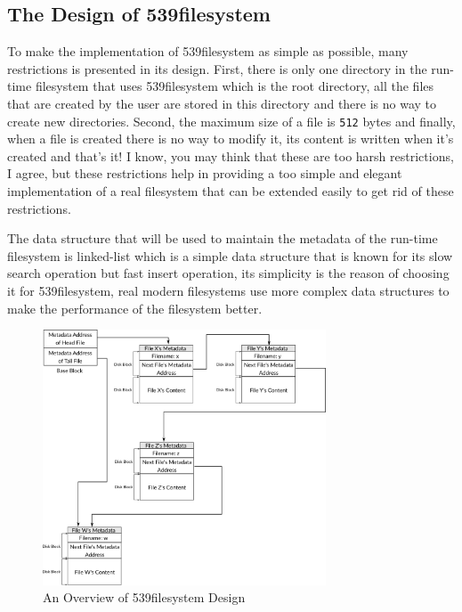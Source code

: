 \subsection{The Design of
539filesystem}\label{the-design-of-539filesystem}

To make the implementation of 539filesystem as simple as possible, many
restrictions is presented in its design. First, there is only one
directory in the run-time filesystem that uses 539filesystem which is
the root directory, all the files that are created by the user are
stored in this directory and there is no way to create new directories.
Second, the maximum size of a file is \lstinline!512! bytes and finally,
when a file is created there is no way to modify it, its content is
written when it's created and that's it! I know, you may think that
these are too harsh restrictions, I agree, but these restrictions help
in providing a too simple and elegant implementation of a real
filesystem that can be extended easily to get rid of these restrictions.

The data structure that will be used to maintain the metadata of the
run-time filesystem is linked-list which is a simple data structure that
is known for its slow search operation but fast insert operation, its
simplicity is the reason of choosing it for 539filesystem, real modern
filesystems use more complex data structures to make the performance of
the filesystem better.

\begin{figure}
\centering
\includegraphics[width=0.75000\textwidth]{Figures/filesystem-ch/539filesystem_overview.png}
\caption{An Overview of 539filesystem
Design}\label{fig:539filesystem_overview}
\end{figure}

